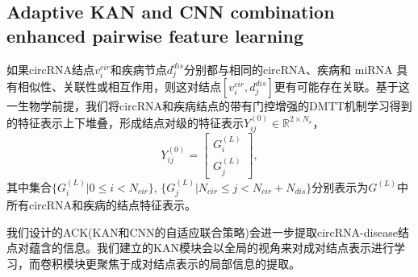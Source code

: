\documentclass{bioinfo}
\begin{document}
\begin{methods}
\subsection{Adaptive KAN and CNN combination enhanced pairwise feature learning}
如果circRNA结点$v_i^{cir}$和疾病节点$d_j^{dis}$分别都与相同的circRNA、疾病和 miRNA 具有相似性、关联性或相互作用，则这对结点$[v_i^{cir},d_j^{dis}]$更有可能存在关联。基于这一生物学前提，我们将circRNA和疾病结点的带有门控增强的DMTT机制学习得到的特征表示上下堆叠，形成结点对级的特征表示${Y_{ij}^{(0)}} \in \mathbb{R} ^{2 \times N_v}$，
\begin{equation}
	{Y_{ij}^{(0)}} = \begin{bmatrix} {G^{(L)}_i} \\ {G^{(L)}_j} \end{bmatrix},
\end{equation}
其中集合$\{G^{(L)}_{i} | 0 \leqslant  i < N_{cir}\}$, $\{G^{(L)}_j | N_{cir} \leqslant j < N_{cir} + N_{dis}\}$分别表示为$G^{(L)}$中所有circRNA和疾病的结点特征表示。

我们设计的ACK(KAN和CNN的自适应联合策略)会进一步提取circRNA-disease结点对蕴含的信息。我们建立的KAN模块会以全局的视角来对成对结点表示进行学习，而卷积模块更聚焦于成对结点表示的局部信息的提取。
\vspace{-0.45cm}


\end{methods}
\end{document}

